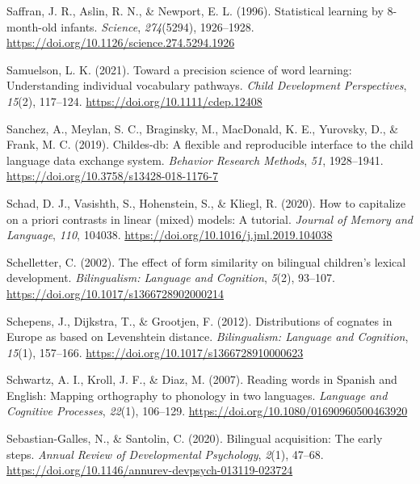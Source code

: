 \documentclass[
  12pt,
  b5paperpaper,
  twoside]{scrreprt}
\newlength{\cslhangindent}
\newlength{\cslentryspacingunit} %
\newenvironment{CSLReferences}[2] %
 {%
  \setlength{\parindent}{0pt}
  \ifodd #1
  \let\oldpar\par
  \def\par{\hangindent=\cslhangindent\oldpar}
  \fi
  \setlength{\parskip}{#2\cslentryspacingunit}
 }%
 {}
\begin{document}
\begin{CSLReferences}{1}{0}
\leavevmode{}%
Saffran, J. R., Aslin, R. N., \& Newport, E. L. (1996). Statistical
learning by 8-month-old infants. \emph{Science}, \emph{274}(5294),
1926--1928. \url{https://doi.org/10.1126/science.274.5294.1926}

\leavevmode{}%
Samuelson, L. K. (2021). Toward a precision science of word learning:
Understanding individual vocabulary pathways. \emph{Child Development
Perspectives}, \emph{15}(2), 117--124.
\url{https://doi.org/10.1111/cdep.12408}

\leavevmode{}%
Sanchez, A., Meylan, S. C., Braginsky, M., MacDonald, K. E., Yurovsky,
D., \& Frank, M. C. (2019). Childes-db: A flexible and reproducible
interface to the child language data exchange system. \emph{Behavior
Research Methods}, \emph{51}, 1928--1941.
\url{https://doi.org/10.3758/s13428-018-1176-7}

\leavevmode{}%
Schad, D. J., Vasishth, S., Hohenstein, S., \& Kliegl, R. (2020). How to
capitalize on a priori contrasts in linear (mixed) models: A tutorial.
\emph{Journal of Memory and Language}, \emph{110}, 104038.
\url{https://doi.org/10.1016/j.jml.2019.104038}

\leavevmode{}%
Schelletter, C. (2002). The effect of form similarity on bilingual
children's lexical development. \emph{Bilingualism: Language and
Cognition}, \emph{5}(2), 93--107.
\url{https://doi.org/10.1017/s1366728902000214}

\leavevmode{}%
Schepens, J., Dijkstra, T., \& Grootjen, F. (2012). Distributions of
cognates in {Europe} as based on {Levenshtein} distance.
\emph{Bilingualism: Language and Cognition}, \emph{15}(1), 157--166.
\url{https://doi.org/10.1017/s1366728910000623}

\leavevmode{}%
Schwartz, A. I., Kroll, J. F., \& Diaz, M. (2007). Reading words in
{Spanish} and {English}: Mapping orthography to phonology in two
languages. \emph{Language and Cognitive Processes}, \emph{22}(1),
106--129. \url{https://doi.org/10.1080/01690960500463920}

\leavevmode{}%
Sebastian-Galles, N., \& Santolin, C. (2020). Bilingual acquisition: The
early steps. \emph{Annual Review of Developmental Psychology},
\emph{2}(1), 47--68.
\url{https://doi.org/10.1146/annurev-devpsych-013119-023724}


\end{CSLReferences}
\end{document}
